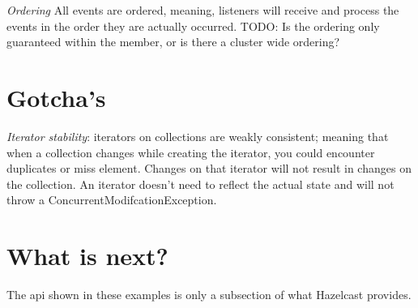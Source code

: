 \emph{Ordering} All events are ordered, meaning, listeners will receive and process the events in the order they are actually occurred. TODO: Is the ordering only guaranteed within the member, or is there a cluster wide ordering?

\section{Gotcha's}
\emph{Iterator stability}: iterators on collections are weakly consistent; meaning that when a collection changes while creating the iterator, you could encounter duplicates or miss element. Changes on that iterator will not result in changes on the collection. An iterator doesn't need to reflect the actual state and will not throw a ConcurrentModifcationException.

\section{What is next?}
The api shown in these examples is only a subsection of what Hazelcast provides.